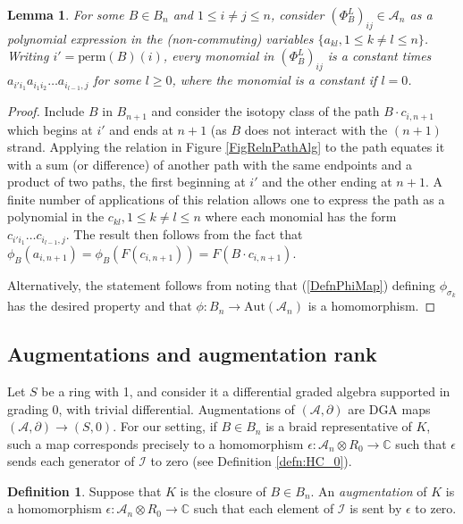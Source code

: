 \documentclass{amsart}[11pt,fullpage]
\def\C{{\mathbb C}}
\def\A{{\mathcal A}}
\def\s{{\sigma}}
\newtheorem{lem}[thm]{Lemma}
\theoremstyle{definition}
\newtheorem{defn}[thm]{Definition}
\begin{document}
  \begin{lem} For some $B\in B_n$ and $1\le i\ne j\le n$, consider $(\Phi_B^L)_{ij}\in \A_n$ as a polynomial expression in the (non-commuting) variables $\{a_{kl}, 1\le k\ne l\le n\}$. Writing $i'=\text{perm}(B)(i)$, every monomial in $(\Phi_B^L)_{ij}$ is a constant times $a_{i'i_1}a_{i_1i_2}\ldots a_{i_{l-1},j}$ for some $l\ge 0$, where the monomial is a constant if $l=0$.
  \label{lem:monomial}
  \end{lem}
  \begin{proof}Include $B$ in $B_{n+1}$ and consider the isotopy class of the path $B\cdot c_{i,n+1}$ which begins at $i'$ and ends at $n+1$ (as $B$ does not interact with the $(n+1)$ strand. Applying the relation in Figure \ref{FigRelnPathAlg} to the path equates it with a sum (or difference) of another path with the same endpoints and a product of two paths, the first beginning at $i'$ and the other ending at $n+1$. A finite number of applications of this relation allows one to express the path as a polynomial in the $c_{kl}, 1\le k\ne l\le n$ where each monomial has the form $c_{i'i_1}\ldots c_{i_{l-1},j}$. The result then follows from the fact that $\phi_B(a_{i,n+1}) = \phi_B(F(c_{i,n+1})) = F(B\cdot c_{i,n+1})$.

  Alternatively, the statement follows from noting that (\ref{DefnPhiMap}) defining $\phi_{\s_k}$ has the desired property and that $\phi:B_n\to\text{Aut}(\A_n)$ is a homomorphism.
  \end{proof}

\subsection{Augmentations and augmentation rank}
\label{SecBG_AugRk}

  Let $S$ be a ring with 1, and consider it a differential graded algebra supported in grading 0, with trivial differential. Augmentations of $(\A,\partial)$ are DGA maps $(\A,\partial)\to (S,0)$. For our setting, if $B\in B_n$ is a braid representative of $K$, such a map corresponds precisely to a homomorphism $\epsilon:\A_n\otimes R_0\to\C$ such that $\epsilon$ sends each generator of $\mathcal I$ to zero (see Definition \ref{defn:HC_0}).

  \begin{defn}
  Suppose that $K$ is the closure of $B\in B_n$. An \emph{augmentation} of $K$ is a homomorphism $\epsilon: \A_n\otimes R_0\rightarrow \C$ such that each element of $\mathcal I$ is sent by $\epsilon$ to zero.
  \label{defn:Aug}
  \end{defn}
\end{document}
